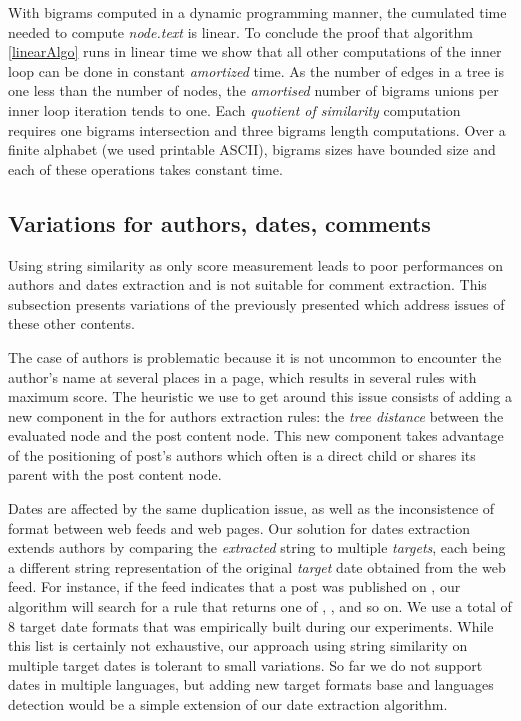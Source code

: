 \linearAlgo

With bigrams computed in a dynamic programming manner, the cumulated time needed to compute \code{(}\emph{node.text}\code{)} is linear. To conclude the proof that algorithm \ref{linearAlgo} runs in linear time we show that all other computations of the inner loop can be done in constant \emph{amortized} time. As the number of edges in a tree is one less than the number of nodes, the \emph{amortised} number of bigrams unions per inner loop iteration tends to one. Each \emph{quotient of similarity} computation requires one bigrams intersection and three bigrams length computations. Over a finite alphabet (we used printable ASCII), bigrams sizes have bounded size and each of these operations takes constant time.


\subsection{Variations for authors, dates, comments}
\label{variationsforauthorsdatesandcomments}

Using string similarity as only score measurement leads to poor performances on authors and dates extraction and is not suitable for comment extraction. This subsection presents variations of the previously presented  which address issues of these other contents.

The case of authors is problematic because it is not uncommon to encounter the author's name at several places in a page, which results in several rules with maximum  score. The heuristic we use to get around this issue consists of adding a new component in the  for authors extraction rules: the \emph{tree distance} between the evaluated node and the post content node. This new component takes advantage of the positioning of post's authors which often is a direct child or shares its parent with the post content node.

Dates are affected by the same duplication issue, as well as the inconsistence of format between web feeds and web pages. Our solution for dates extraction extends authors  by comparing the \emph{extracted} string to multiple \emph{targets}, each being a different string representation of the original \emph{target} date obtained from the web feed. For instance, if the feed indicates that a post was published on , our algorithm will search for a rule that returns one of , ,  and so on. We use a total of 8 target date formats that was empirically built during our experiments. While this list is certainly not exhaustive, our approach using string similarity on multiple target dates is tolerant to small variations. So far we do not support dates in multiple languages, but adding new target formats base and languages detection would be a simple extension of our date extraction algorithm.

